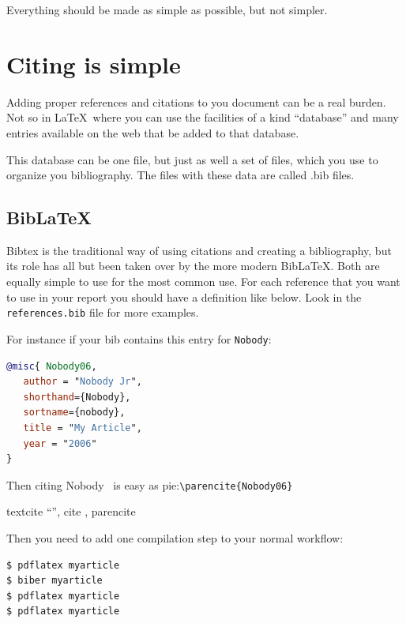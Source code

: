 \def\TheFile{ch08_citingsimple.tex}

\begin{savequote}[15cm]
  \vspace{-30mm}
  \raggedleft
\sffamily
Everything should be made as simple as possible, but not simpler.
\end{savequote}
\chapter{Citing is simple}

Adding proper references and citations to you document can be a real
burden.
Not so in \LaTeX\ where you can use the facilities of a kind ``database''
and many entries available on the web that be added to that database.

This database can be one file, but just as well a set of files, which
you use to organize you bibliography. The files with these data are
called .bib files.

\section{Bib\LaTeX}
Bibtex is the traditional way of using citations and creating a bibliography, but its
role has all but been taken over by the more modern Bib\LaTeX.
Both are equally simple to use for the most common use. For each reference that you want to use in your report
you should have a definition like below. Look in the \texttt{references.bib} file for more examples.

For instance if your bib contains this entry for \texttt{Nobody}:
\begin{lstlisting}[language=BibTeX]
@misc{ Nobody06,
   author = "Nobody Jr",
   shorthand={Nobody},
   sortname={nobody},
   title = "My Article",
   year = "2006"
}
\end{lstlisting}
\lstset{language=BibTeX}
Then citing Nobody~\parencite{Nobody06} is easy as
pie:\lstinline|\parencite{Nobody06}|

textcite ``\textcite{Nobody06}'', cite \cite{Nobody06}, parencite \parencite{Nobody06}

Then you need to add one compilation step to your normal workflow:

\begin{lstlisting}[language=sh]
$ pdflatex myarticle
$ biber myarticle
$ pdflatex myarticle
$ pdflatex myarticle
\end{lstlisting}

